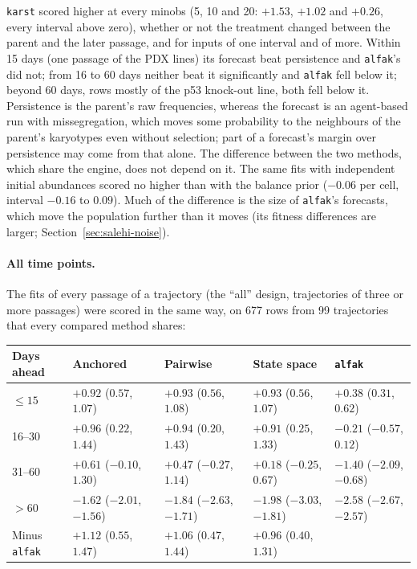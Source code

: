 \documentclass[11pt]{article}
\begin{document}
\texttt{karst} scored higher at every minobs (5, 10 and 20: $+1.53$, $+1.02$
and $+0.26$, every interval above zero), whether or not the treatment changed
between the parent and the later passage, and for inputs of one interval and
of more. Within 15 days (one passage of the PDX lines) its forecast beat
persistence and \texttt{alfak}'s did not; from 16 to 60 days neither beat it
significantly and \texttt{alfak} fell below it; beyond 60 days, rows mostly of
the p53 knock-out line, both fell below it. Persistence is the parent's raw
frequencies, whereas the forecast is an agent-based run with missegregation,
which moves some probability to the neighbours of the parent's karyotypes
even without selection; part of a forecast's margin over persistence may come
from that alone. The difference between the two methods, which share the
engine, does not depend on it. The same fits with
independent initial abundances scored no higher than with the balance prior
($-0.06$ per cell, interval $-0.16$ to $0.09$). Much of the difference is the
size of \texttt{alfak}'s forecasts, which move the population further than
it moves (its fitness differences are larger;
Section~\ref{sec:salehi-noise}).

\paragraph{All time points.} The fits of every passage of a trajectory (the
``all'' design, trajectories of three or more passages) were scored in the same
way, on 677 rows from 99 trajectories that every compared method shares:

\begin{center}
\begin{tabular}{L{0.14\textwidth}L{0.16\textwidth}L{0.16\textwidth}L{0.16\textwidth}L{0.16\textwidth}}
\toprule
Days ahead & Anchored & Pairwise & State space & \texttt{alfak} \\
\midrule
$\le 15$ & $+0.92$ ($0.57$, $1.07$) & $+0.93$ ($0.56$, $1.08$) & $+0.93$ ($0.56$, $1.07$) & $+0.38$ ($0.31$, $0.62$) \\
16--30 & $+0.96$ ($0.22$, $1.44$) & $+0.94$ ($0.20$, $1.43$) & $+0.91$ ($0.25$, $1.33$) & $-0.21$ ($-0.57$, $0.12$) \\
31--60 & $+0.61$ ($-0.10$, $1.30$) & $+0.47$ ($-0.27$, $1.14$) & $+0.18$ ($-0.25$, $0.67$) & $-1.40$ ($-2.09$, $-0.68$) \\
$> 60$ & $-1.62$ ($-2.01$, $-1.56$) & $-1.84$ ($-2.63$, $-1.71$) & $-1.98$ ($-3.03$, $-1.81$) & $-2.58$ ($-2.67$, $-2.57$) \\
\midrule
Minus \texttt{alfak} & $+1.12$ ($0.55$, $1.47$) & $+1.06$ ($0.47$, $1.44$) & $+0.96$ ($0.40$, $1.31$) & \\
\bottomrule
\end{tabular}
\end{center}
\end{document}
